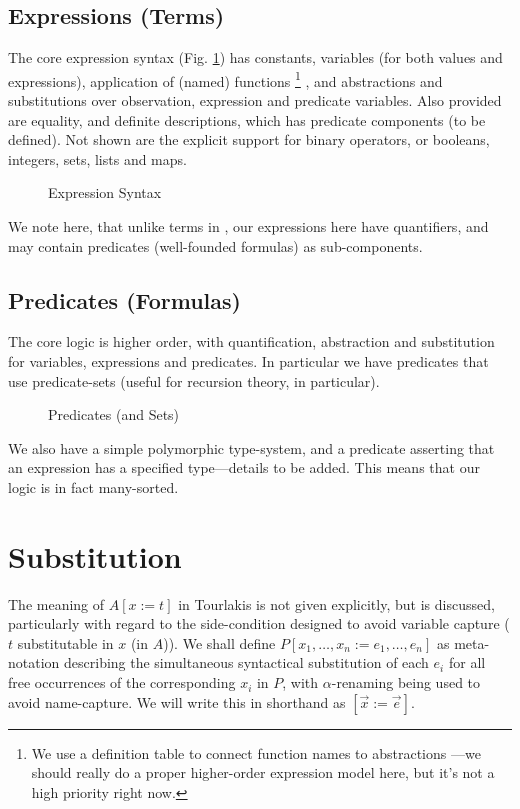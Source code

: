 \subsection{Expressions (Terms)}

The core expression syntax (Fig. \ref{fig:UTP2:expressions})
has constants, variables
(for both values and expressions),
application of (named) functions%
\footnote{%
We use a definition table to connect function names to abstractions
---we should really do a proper higher-order expression model here,
but it's not a high priority right now.}
,
and abstractions and substitutions over observation, expression and predicate variables.
Also provided are equality, and definite descriptions, which has predicate components (to be defined).
Not shown are the explicit support for binary operators,
or booleans, integers, sets, lists and maps.
\begin{figure}
\framebox{\EXPRMATHSYNTAX}
  \caption{ Expression Syntax}
  \label{fig:UTP2:expressions}
\end{figure}
We note here, that unlike terms in \cite{journals/logcom/Tourlakis01},
our expressions here have quantifiers, and may contain predicates
(well-founded formulas) as sub-components.


\subsection{Predicates (Formulas)}

The core logic is higher order,
with quantification, abstraction and substitution for variables, expressions and predicates.
In particular we have predicates that use predicate-sets
(useful for recursion theory, in particular).
\begin{figure}
\framebox{\PREDMATHSYNTAX}
  \caption{ Predicates (and Sets)}
  \label{fig:UTP2:predicates}
\end{figure}
We also have a simple polymorphic type-system, and a predicate asserting that
an expression has a specified type---details to be added.
This means that our logic is in fact many-sorted.


\section{Substitution}

The meaning of $A[x:=t]$ in Tourlakis is not given
explicitly, but is discussed, particularly with regard
to the  side-condition designed to avoid variable capture ($t$ substitutable in $x$ (in $A$)).
We shall define $P[x_1,\ldots,x_n:=e_1,\ldots,e_n]$
as meta-notation describing the simultaneous syntactical substitution
of each $e_i$ for all free occurrences of the corresponding $x_i$ in $P$, with $\alpha$-renaming being
used to avoid name-capture. We will write this in shorthand as $[\vec x:=\vec e]$.

